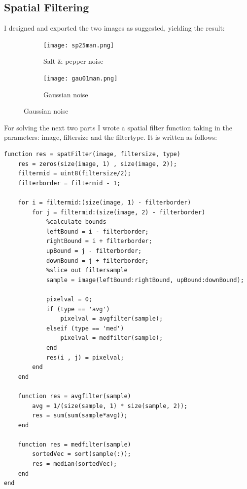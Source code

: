 \documentclass{article}
\begin{document}
\subsection{Spatial Filtering}
I designed and exported the two images as suggested, yielding the result:
\begin{figure}[h]
	\centering
	\begin{subfigure}[b]{0.45\textwidth}
		\texttt{[image: sp25man.png]}
		\label{fig:sp25man.png}
		\caption{Salt \& pepper noise}
	\end{subfigure}
	\begin{subfigure}[b]{0.45\textwidth}
		\texttt{[image: gau01man.png]}
		\label{fig:gau01man.png}
		\caption{Gaussian noise}
	\end{subfigure}
\end{figure}

\newpage
For solving the next two parts I wrote a spatial filter function taking in the parameters: image, filtersize and the filtertype. It is written as follows:

\begin{lstlisting}
function res = spatFilter(image, filtersize, type)
    res = zeros(size(image, 1) , size(image, 2));
    filtermid = uint8(filtersize/2);
    filterborder = filtermid - 1;
    
    for i = filtermid:(size(image, 1) - filterborder)
        for j = filtermid:(size(image, 2) - filterborder)
            %calculate bounds
            leftBound = i - filterborder;
            rightBound = i + filterborder;
            upBound = j - filterborder;
            downBound = j + filterborder;
            %slice out filtersample
            sample = image(leftBound:rightBound, upBound:downBound);
            
            pixelval = 0;
            if (type == 'avg')
                pixelval = avgfilter(sample);
            elseif (type == 'med')
                pixelval = medfilter(sample);
            end
            res(i , j) = pixelval;
        end
    end
    
    function res = avgfilter(sample)
        avg = 1/(size(sample, 1) * size(sample, 2));
        res = sum(sum(sample*avg));
    end

    function res = medfilter(sample)
        sortedVec = sort(sample(:));
        res = median(sortedVec);
    end
end
\end{lstlisting}

\newpage
\end{document}
